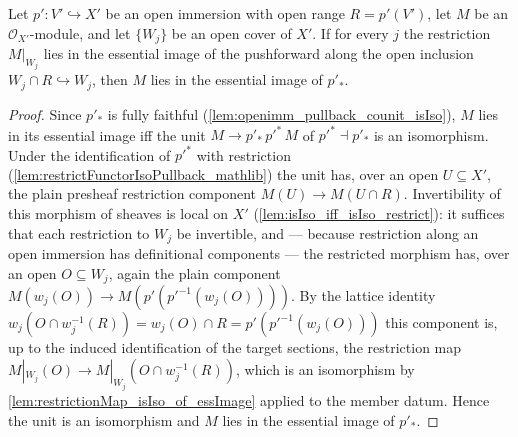 \begin{lemma}\leanok
  \label{lem:essimage_pushforward_cover_local}
  Let \(p' : V' \hookrightarrow X'\) be an open immersion with open range \(R = p'(V')\), let
  \(M\) be an \(\mathcal{O}_{X'}\)-module, and let \(\{W_j\}\) be an open cover of \(X'\).  If
  for every \(j\) the restriction \(M|_{W_j}\) lies in the essential image of the pushforward
  along the open inclusion \(W_j \cap R \hookrightarrow W_j\), then \(M\) lies in the essential
  image of \(p'_*\).
\end{lemma}
\begin{proof}\leanok
  Since \(p'_*\) is fully faithful (\cref{lem:openimm_pullback_counit_isIso}), \(M\) lies in its
  essential image iff the unit \(M \to p'_*\,p'^*\,M\) of \(p'^* \dashv p'_*\) is an isomorphism.
  Under the identification of \(p'^*\) with restriction
  (\cref{lem:restrictFunctorIsoPullback_mathlib}) the unit has, over an open \(U \subseteq X'\),
  the plain presheaf restriction component \(M(U) \to M(U \cap R)\).  Invertibility of this
  morphism of sheaves is local on \(X'\) (\cref{lem:isIso_iff_isIso_restrict}): it suffices that
  each restriction to \(W_j\) be invertible, and — because restriction along an open immersion
  has definitional components — the restricted morphism has, over an open \(O \subseteq W_j\),
  again the plain component \(M(w_j(O)) \to M(p'(p'^{-1}(w_j(O))))\).  By the lattice identity
  \(w_j(O \cap w_j^{-1}(R)) = w_j(O) \cap R = p'(p'^{-1}(w_j(O)))\) this component is, up to the
  induced identification of the target sections, the restriction map
  \(M|_{W_j}(O) \to M|_{W_j}(O \cap w_j^{-1}(R))\), which is an isomorphism by
  \cref{lem:restrictionMap_isIso_of_essImage} applied to the member datum.  Hence the unit is an
  isomorphism and \(M\) lies in the essential image of \(p'_*\).
\end{proof}

